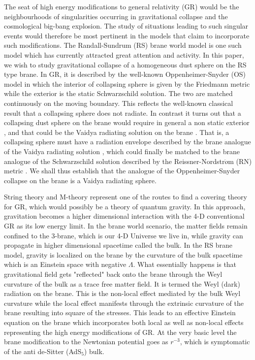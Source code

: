 \documentclass[a4paper,twocolumn,showpacs,preprintnumbers,amsmath,amssymb]{revtex4}
\begin{document}
The seat of high energy modifications to general relativity (GR) would be
the neighbourhoods of singularities occurring in gravitational collapse and
the cosmological big-bang explosion. The study of situations leading to such
singular events would therefore be most pertinent in the models that claim
to incorporate such modifications. The Randall-Sundrum (RS) brane world 
model \cite{r1} is one such model which has currently attracted great 
attention and 
activity. In this paper, we wish to study
gravitational collapse of a homogeneous dust sphere on the RS type brane. 
In GR, it is described by the well-known
Oppenheimer-Snyder (OS) model \cite{n1} in which the interior of 
collapsing sphere
is given by the Friedmann metric while the exterior is the static 
Schwarzschild solution. The two are matched continuously on the moving
boundary. This reflects the well-known classical result that a 
collapsing sphere does not radiate. In contrast it turns out that a 
collapsing dust sphere on the brane would require in general a non static 
exterior \cite{r}, and that could be the Vaidya radiating solution on the 
brane \cite{n2}.
That is, a collapsing sphere must have a radiation envelope 
described by the brane analogue of the Vaidya radiating solution \cite{n2}, 
which could finally be matched to the brane analogue of the Schwarzschild 
solution described by the Reissner-Nordstr${\ddot o}$m (RN) metric 
\cite{r6}. We shall thus establish that the analogue of the 
Oppenheimer-Snyder collapse on the brane is a Vaidya radiating sphere. 


String theory and M-theory represent one of the routes to find a
covering theory for GR, which would possibly be a theory of quantum gravity.
In this approach, gravitation becomes a higher
dimensional interaction with the 4-D conventional GR as its low energy
limit. In the brane world scenario, the matter fields remain confined to the
3-brane, which is our 4-D Universe we live in, while gravity can propagate
in higher dimensional spacetime called the bulk. In the RS brane model,
gravity is localized on the brane by the curvature of
the bulk spacetime which is an Einstein space with negative $\Lambda$.
What essentially happens is that gravitational field gets "reflected" back
onto the brane through the Weyl curvature of the bulk as a trace free matter
field. It is termed the Weyl (dark) radiation on the brane. This is the
non-local effect mediated by the bulk Weyl
curvature while the local effect manifests through the extrinsic curvature
of the brane resulting into square of the stresses.
This leads to an effective Einstein 
equation on the brane \cite{r2} which
incorporates both local as well as non-local effects representing the high
energy modifications of GR. At the very basic level the brane modification to 
the Newtonian potential goes as $r^{-3}$, which is symptomatic of the anti 
de-Sitter (AdS$_{5}$) bulk.
\end{document}

